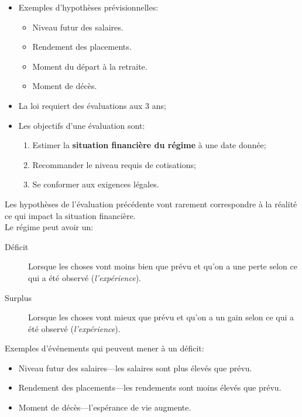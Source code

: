 \documentclass[10pt, french]{article}
\begin{document}
\begin{multicols*}{3}
\begin{definitionNOHFILLsub}
\begin{itemize}[leftmargin = *]
	\item	Exemples d'hypothèses prévisionnelles:
		\begin{itemize}[leftmargin = *]
		\item	Niveau futur des salaires.
		\item	Rendement des placements.
		\item	Moment du départ à la retraite.
		\item	Moment de décès.
		\end{itemize}
	\item	La loi requiert des évaluations aux 3 ans;
	\item	Les objectifs d'une évaluation sont:
		\begin{enumerate}
		\item	Estimer la \textbf{situation financière du régime} à une date donnée;
		\item	Recommander le niveau requis de cotisations;
		\item	Se conformer aux exigences légales.
		\end{enumerate}
\end{itemize}
\end{definitionNOHFILLsub}

\begin{definitionNOHFILLsub}
Les hypothèses de l'évaluation précédente vont rarement correspondre à la réalité ce qui impact la situation financière.\\

Le régime peut avoir un:
\begin{description}
	\item[Déficit]	Lorsque les choses vont moins bien que prévu et qu'on a une perte selon ce qui a été observé (\textit{l'expérience}).
	\item[Surplus]	Lorsque les choses vont mieux que prévu et qu'on a un gain selon ce qui a été observé (\textit{l'expérience}).
\end{description}

Exemples d'événements qui peuvent mener à un déficit:
\begin{itemize}[leftmargin = *]
	\item	Niveau futur des salaires---les salaires sont plus élevés que prévu.
	\item	Rendement des placements---les rendements sont moins élevés que prévu.
	\item	Moment de décès---l'espérance de vie augmente.
\end{itemize}



\end{definitionNOHFILLsub}
\end{multicols*}
\end{document}

